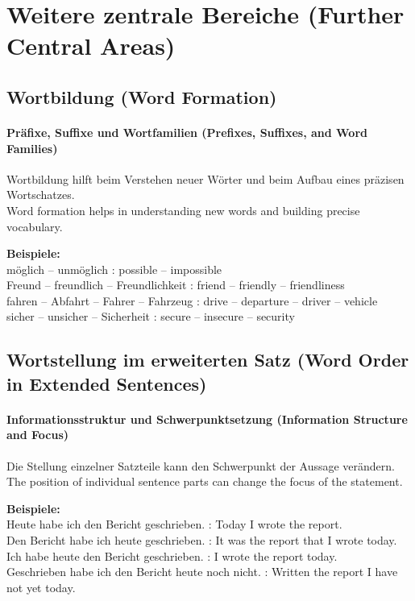 \documentclass[a4paper]{article}
\begin{document}
    
    \section{Weitere zentrale Bereiche {\small (Further Central Areas)}}
    
    \subsection{Wortbildung {\small (Word Formation)}}
        
        \paragraph{Präfixe, Suffixe und Wortfamilien {\small (Prefixes, Suffixes, and Word Families)}}
            Wortbildung hilft beim Verstehen neuer Wörter und beim Aufbau eines präzisen Wortschatzes.\\
            Word formation helps in understanding new words and building precise vocabulary.
            
            \textbf{Beispiele:}\\
            möglich -- unmöglich : possible -- impossible\\
            Freund -- freundlich -- Freundlichkeit : friend -- friendly -- friendliness\\
            fahren -- Abfahrt -- Fahrer -- Fahrzeug : drive -- departure -- driver -- vehicle\\
            sicher -- unsicher -- Sicherheit : secure -- insecure -- security
    
    \subsection{Wortstellung im erweiterten Satz {\small (Word Order in Extended Sentences)}}
    
    \paragraph{Informationsstruktur und Schwerpunktsetzung {\small (Information Structure and Focus)}}
        Die Stellung einzelner Satzteile kann den Schwerpunkt der Aussage verändern.\\
        The position of individual sentence parts can change the focus of the statement.
        
        \textbf{Beispiele:}\\
        Heute habe ich den Bericht geschrieben. : Today I wrote the report.\\
        Den Bericht habe ich heute geschrieben. : It was the report that I wrote today.\\
        Ich habe heute den Bericht geschrieben. : I wrote the report today.\\
        Geschrieben habe ich den Bericht heute noch nicht. : Written the report I have not yet today.
    
\end{document}
